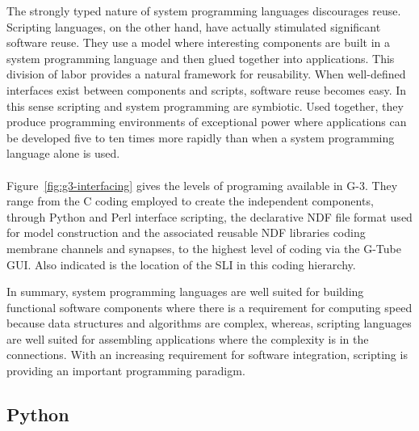 \documentclass[10pt]{article}
\begin{document}
The strongly typed nature of system programming languages discourages
reuse. Scripting languages, on the other hand, have actually
stimulated significant software reuse. They use a model where
interesting components are built in a system programming language and
then glued together into applications.
This division of labor provides a natural framework for reusability.
When well-defined interfaces exist between components and scripts, software reuse becomes easy.
In this sense scripting and system programming are symbiotic. Used
together, they produce programming environments of exceptional power where applications can be developed
five to ten times more rapidly than when a system programming language alone is used.\\

\\

Figure~\ref{fig:g3-interfacing} gives the levels of programing available in G-3. They range from the C coding employed to create the independent components, through Python and Perl interface scripting, the declarative NDF file format used for model construction and the associated reusable NDF libraries coding membrane channels and synapses, to the highest level of coding via the G-Tube GUI. Also indicated is the location of the SLI in this coding hierarchy.

In summary, system programming languages are well suited for building functional software
components where there is a requirement for computing speed because data structures and
algorithms are complex, whereas, scripting languages are well suited for assembling
applications where the complexity is in the connections. With an
increasing requirement for software integration, scripting is
providing an important programming paradigm.





\subsection*{Python}
\end{document}
